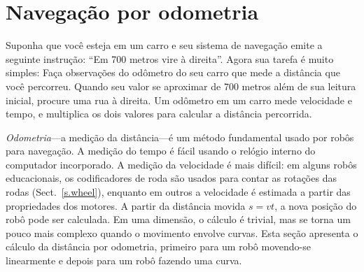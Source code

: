 {%

\section{Navegação por odometria}\label{s.odometry}

Suponha que você esteja em um carro e seu sistema de navegação emite a seguinte instrução: ``Em 700 metros vire à direita''. Agora sua tarefa é muito simples: Faça observações do odômetro do seu carro que mede a distância que você percorreu. Quando seu valor se aproximar de 700 metros além de sua leitura inicial, procure uma rua à direita. Um odômetro em um carro mede velocidade e tempo, e multiplica os dois valores para calcular a distância percorrida.

\emph{Odometria}---a medição da distância---é um método fundamental usado por robôs para navegação. A medição do tempo é fácil usando o relógio interno do computador incorporado. A medição da velocidade é mais difícil: em alguns robôs educacionais, os codificadores de roda são usados para contar as rotações das rodas (Sect.~\ref{s.wheel}), enquanto em outros a velocidade é estimada a partir das propriedades dos motores. A partir da distância movida $s=vt$, a nova posição do robô pode ser calculada. Em uma dimensão, o cálculo é trivial, mas se torna um pouco mais complexo quando o movimento envolve curvas. Esta seção apresenta o cálculo da distância por odometria, primeiro para um robô movendo-se linearmente e depois para um robô fazendo uma curva.

}
